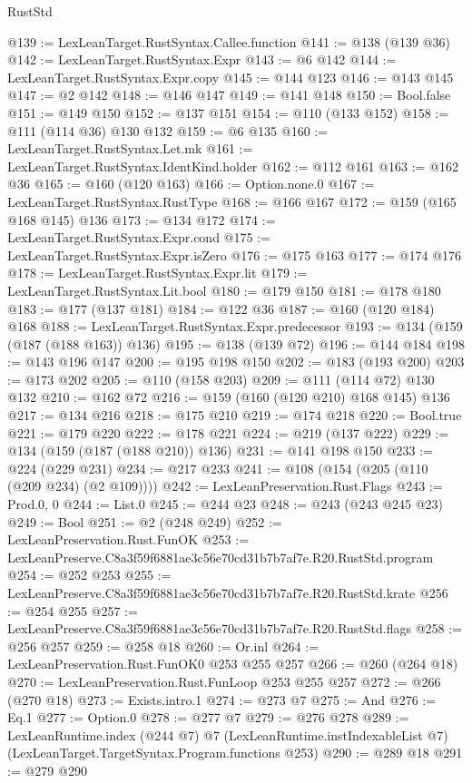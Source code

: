 \begin{lexlean}{RustStd}
\begin{coremodule}
@139 := LexLeanTarget.RustSyntax.Callee.function
@141 := @138 (@139 @36)
@142 := LexLeanTarget.RustSyntax.Expr
@143 := @6 @142
@144 := LexLeanTarget.RustSyntax.Expr.copy
@145 := @144 @123
@146 := @143 @145
@147 := @2 @142
@148 := @146 @147
@149 := @141 @148
@150 := Bool.false
@151 := @149 @150
@152 := @137 @151
@154 := @110 (@133 @152)
@158 := @111 (@114 @36) @130 @132
@159 := @6 @135
@160 := LexLeanTarget.RustSyntax.Let.mk
@161 := LexLeanTarget.RustSyntax.IdentKind.holder
@162 := @112 @161
@163 := @162 @36
@165 := @160 (@120 @163)
@166 := Option.none.{0}
@167 := LexLeanTarget.RustSyntax.RustType
@168 := @166 @167
@172 := @159 (@165 @168 @145) @136
@173 := @134 @172
@174 := LexLeanTarget.RustSyntax.Expr.cond
@175 := LexLeanTarget.RustSyntax.Expr.isZero
@176 := @175 @163
@177 := @174 @176
@178 := LexLeanTarget.RustSyntax.Expr.lit
@179 := LexLeanTarget.RustSyntax.Lit.bool
@180 := @179 @150
@181 := @178 @180
@183 := @177 (@137 @181)
@184 := @122 @36
@187 := @160 (@120 @184) @168
@188 := LexLeanTarget.RustSyntax.Expr.predecessor
@193 := @134 (@159 (@187 (@188 @163)) @136)
@195 := @138 (@139 @72)
@196 := @144 @184
@198 := @143 @196 @147
@200 := @195 @198 @150
@202 := @183 (@193 @200)
@203 := @173 @202
@205 := @110 (@158 @203)
@209 := @111 (@114 @72) @130 @132
@210 := @162 @72
@216 := @159 (@160 (@120 @210) @168 @145) @136
@217 := @134 @216
@218 := @175 @210
@219 := @174 @218
@220 := Bool.true
@221 := @179 @220
@222 := @178 @221
@224 := @219 (@137 @222)
@229 := @134 (@159 (@187 (@188 @210)) @136)
@231 := @141 @198 @150
@233 := @224 (@229 @231)
@234 := @217 @233
@241 := @108 (@154 (@205 (@110 (@209 @234) (@2 @109))))
@242 := LexLeanPreservation.Rust.Flags
@243 := Prod.{0, 0}
@244 := List.{0}
@245 := @244 @23
@248 := @243 (@243 @245 @23)
@249 := Bool
@251 := @2 (@248 @249)
@252 := LexLeanPreservation.Rust.FunOK
@253 := LexLeanPreserve.C8a3f59f6881ae3c56e70cd31b7b7af7e.R20.RustStd.program
@254 := @252 @253
@255 := LexLeanPreserve.C8a3f59f6881ae3c56e70cd31b7b7af7e.R20.RustStd.krate
@256 := @254 @255
@257 := LexLeanPreserve.C8a3f59f6881ae3c56e70cd31b7b7af7e.R20.RustStd.flags
@258 := @256 @257
@259 := @258 @18
@260 := Or.inl
@264 := LexLeanPreservation.Rust.FunOK0 @253 @255 @257
@266 := @260 (@264 @18)
@270 := LexLeanPreservation.Rust.FunLoop @253 @255 @257
@272 := @266 (@270 @18)
@273 := Exists.intro.{1}
@274 := @273 @7
@275 := And
@276 := Eq.{1}
@277 := Option.{0}
@278 := @277 @7
@279 := @276 @278
@289 := LexLeanRuntime.index
    (@244 @7)
    @7
    (LexLeanRuntime.instIndexableList @7)
    (LexLeanTarget.TargetSyntax.Program.functions @253)
@290 := @289 @18
@291 := @279 @290

\end{coremodule}
\end{lexlean}
